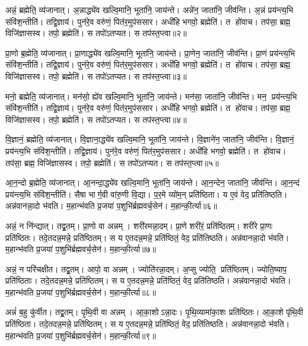 अन्नं॒ ब्रह्मेति॒ व्य॑जानात्। अ॒न्नाद्ध्ये॑व खल्वि॒मानि॒ भूता॑नि॒ जाय॑न्ते। अन्ने॑न॒ जाता॑नि॒ जीव॑न्ति। अ॒न्नं प्रय॑न्त्य॒भि  संवि॑श॒न्तीति॑। तद्वि॒ज्ञाय॑। पुन॑रे॒व वरु॑णं॒ पित॑र॒मुप॑ससार। अधी॑हि भगवो॒ ब्रह्मेति॑। त हो॑वाच। तप॑सा॒ ब्रह्म॒ विजि॑ज्ञासस्व। तपो॒ ब्रह्मेति॑। स तपो॑ऽतप्यत। स तप॑स्त॒प्त्वा॥२॥

प्रा॒णो ब्र॒ह्मेति॒ व्य॑जानात्। प्रा॒णाद्ध्ये॑व खल्वि॒मानि॒ भूता॑नि॒ जाय॑न्ते। प्रा॒णेन॒ जाता॑नि॒ जीव॑न्ति। प्रा॒णं प्रय॑न्त्य॒भि  संवि॑श॒न्तीति॑। तद्वि॒ज्ञाय॑। पुन॑रे॒व वरु॑णं॒ पित॑र॒मुप॑ससार। अधी॑हि भगवो॒ ब्रह्मेति॑। त हो॑वाच। तप॑सा॒ ब्रह्म॒ विजि॑ज्ञासस्व। तपो॒ ब्रह्मेति॑। स तपो॑ऽतप्यत। स तप॑स्त॒प्त्वा॥३॥

मनो॒ ब्रह्मेति॒ व्य॑जानात्। मन॑सो॒ ह्ये॑व खल्वि॒मानि॒ भूता॑नि॒ जाय॑न्ते। मन॑सा॒ जाता॑नि॒ जीव॑न्ति। मन॒ प्रय॑न्त्य॒भि  संवि॑श॒न्तीति॑। तद्वि॒ज्ञाय॑। पुन॑रे॒व वरु॑णं॒ पित॑र॒मुप॑ससार। अधी॑हि भगवो॒ ब्रह्मेति॑। त हो॑वाच। तप॑सा॒ ब्रह्म॒ विजि॑ज्ञासस्व। तपो॒ ब्रह्मेति॑। स तपो॑ऽतप्यत। स तप॑स्त॒प्त्वा॥४॥

वि॒ज्ञानं॒ ब्रह्मेति॒ व्य॑जानात्। वि॒ज्ञाना॒द्ध्ये॑व खल्वि॒मानि॒ भूता॑नि॒ जाय॑न्ते। वि॒ज्ञाने॑न॒ जाता॑नि॒ जीव॑न्ति। वि॒ज्ञानं॒ प्रय॑न्त्य॒भि संवि॑श॒न्तीति॑। तद्वि॒ज्ञाय॑। पुन॑रे॒व वरु॑णं॒ पित॑र॒मुप॑ससार। अधी॑हि भगवो॒ ब्रह्मेति॑। त हो॑वाच। तप॑सा॒ ब्रह्म॒ विजि॑ज्ञासस्व। तपो॒ ब्रह्मेति॑। स तपो॑ऽतप्यत। स तप॑स्त॒प्त्वा॥५॥

आ॒न॒न्दो ब्र॒ह्मेति॒ व्य॑जानात्। आ॒नन्दा॒द्ध्ये॑व खल्वि॒मानि॒ भूता॑नि॒ जाय॑न्ते। आ॒न॒न्देन॒ जाता॑नि॒ जीव॑न्ति। आ॒न॒न्दं प्रय॑न्त्य॒भि संवि॑श॒न्तीति॑। सैषा भार्ग॒वी वा॑रु॒णी वि॒द्या। प॒र॒मे व्यो॑म॒न् प्रति॑ष्ठिता। य ए॒वं वेद॒ प्रति॑तिष्ठति। अन्न॑वानन्ना॒दो भ॑वति। म॒हान्भ॑वति प्र॒जया॑ प॒शुभि॑र्ब्रह्मवर्च॒सेन॑। म॒हान्की॒र्त्या॥६॥

अन्नं॒ न नि॑न्द्यात्। तद्व्र॒तम्। प्रा॒णो वा अन्नम्। शरी॑रमन्ना॒दम्। प्रा॒णे शरी॑रं॒ प्रति॑ष्ठितम्। शरी॑रे प्रा॒णः प्रति॑ष्ठितः। तदे॒तदन्न॒मन्ने॒ प्रति॑ष्ठितम्। स य ए॒तदन्न॒मन्ने॒ प्रति॑ष्ठितं॒ वेद॒ प्रति॑तिष्ठति। अन्न॑वानन्ना॒दो भ॑वति। म॒हान्भ॑वति प्र॒जया॑ प॒शुभि॑र्ब्रह्मवर्च॒सेन॑। म॒हान्की॒र्त्या॥७॥

अन्नं॒ न परि॑चक्षीत। तद्व्र॒तम्। आपो॒ वा अन्नम्। ज्योति॑रन्ना॒दम्। अ॒प्सु ज्योति॒ प्रति॑ष्ठितम्। ज्योति॒ष्याप॒ प्रति॑ष्ठिताः। तदे॒तदन्न॒मन्ने॒ प्रति॑ष्ठितम्। स य ए॒तदन्न॒मन्ने॒ प्रति॑ष्ठितं॒ वेद॒ प्रति॑तिष्ठति। अन्न॑वानन्ना॒दो भ॑वति। म॒हान्भ॑वति प्र॒जया॑ प॒शुभि॑र्ब्रह्मवर्च॒सेन॑। म॒हान्की॒र्त्या॥८॥

अन्नं॑ ब॒हु कु॑र्वीत। तद्व्र॒तम्। पृ॒थि॒वी वा अन्नम्। आ॒का॒शोऽन्ना॒दः। पृ॒थि॒व्यामा॑का॒शः प्रति॑ष्ठितः। आ॒का॒शे पृ॑थि॒वी प्रति॑ष्ठिता। तदे॒तदन्न॒मन्ने॒ प्रति॑ष्ठितम्। स य ए॒तदन्न॒मन्ने॒ प्रति॑ष्ठितं॒ वेद॒ प्रति॑तिष्ठति। अन्न॑वानन्ना॒दो भ॑वति। म॒हान्भ॑वति प्र॒जया॑ प॒शुभि॑र्ब्रह्मवर्च॒सेन॑। म॒हान्की॒र्त्या॥९॥

